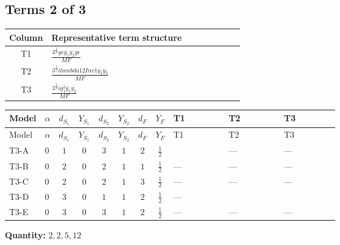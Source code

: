 \documentclass[8pt]{article}
\begin{document}
\begin{landscape}
\subsection*{Terms 2 of 3}
\begin{center}
\begin{tabular}{@{}c >{\raggedright\arraybackslash}p{0.82\linewidth}@{}}
\toprule
Column & Representative term structure \\
\midrule
T1 & \(\displaystyle \frac{3^{\frac{3}{4}} ye \overline{y_{1}} \overline{y_{2}} \overline{ye}}{MF}\) \\
\midrule
T2 & \(\displaystyle \frac{3^{\frac{3}{4}} i lambda12Inv1 \overline{y_{1}} \overline{y_{2}}}{MF}\) \\
\midrule
T3 & \(\displaystyle \frac{3^{\frac{3}{4}} i g_{1}^{2} \overline{y_{1}} \overline{y_{2}}}{MF}\) \\
\midrule
\bottomrule
\end{tabular}
\end{center}
\smallskip
\tiny
\begin{longtable}{@{}llcccccc >{\raggedright\arraybackslash}p{0.21\linewidth} >{\raggedright\arraybackslash}p{0.21\linewidth} >{\raggedright\arraybackslash}p{0.21\linewidth}@{}}
\toprule
Model & $\alpha$ & $d_{S_1}$ & $Y_{S_1}$ & $d_{S_2}$ & $Y_{S_2}$ & $d_F$ & $Y_F$ & T1 & T2 & T3 \\
\midrule
\endfirsthead
\toprule
Model & $\alpha$ & $d_{S_1}$ & $Y_{S_1}$ & $d_{S_2}$ & $Y_{S_2}$ & $d_F$ & $Y_F$ & T1 & T2 & T3 \\
\midrule
\endhead
T3-A & $0$ & $1$ & $0$ & $3$ & $1$ & $2$ & $\frac{1}{2}$ & \scriptsize\adjustbox{max width=\linewidth}{$\begin{gathered} - \frac{3^{\frac{3}{4}} ye \overline{y_{1}} \overline{y_{2}} \overline{ye}}{12 MF}\end{gathered}$} & --- & --- \\
\midrule
T3-B & $0$ & $2$ & $0$ & $2$ & $1$ & $1$ & $\frac{1}{2}$ & --- & --- & --- \\
\midrule
T3-C & $0$ & $2$ & $0$ & $2$ & $1$ & $3$ & $\frac{1}{2}$ & --- & --- & --- \\
\midrule
T3-D & $0$ & $3$ & $0$ & $1$ & $1$ & $2$ & $\frac{1}{2}$ & --- & \scriptsize\adjustbox{max width=\linewidth}{$\begin{gathered} \frac{3^{\frac{3}{4}} i lambda12Inv1 \overline{y_{1}} \overline{y_{2}}}{6 MF}\end{gathered}$} & \scriptsize\adjustbox{max width=\linewidth}{$\begin{gathered} \frac{3^{\frac{3}{4}} i g_{1}^{2} \overline{y_{1}} \overline{y_{2}}}{8 MF}\end{gathered}$} \\
\midrule
T3-E & $0$ & $3$ & $0$ & $3$ & $1$ & $2$ & $\frac{1}{2}$ & --- & --- & --- \\
\midrule
\bottomrule
\end{longtable}
\clearpage
\noindent\textbf{Quantity: }$\mathrm{2,2,5,12}$\par\smallskip

\end{landscape}
\end{document}
